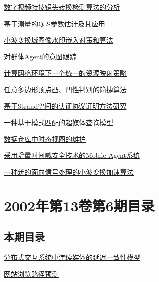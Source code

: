 \documentclass[a4paper]{article}
\begin{document}
\href{http://www.jos.org.cn/ch/reader/download_pdf.aspx?file_no=20020713&year_id=2002&quarter_id=7&falg=1}{数字视频特技镜头转换检测算法的分析}

\href{http://www.jos.org.cn/ch/reader/download_pdf.aspx?file_no=20020714&year_id=2002&quarter_id=7&falg=1}{基于测量的QoS参数估计及其应用}

\href{http://www.jos.org.cn/ch/reader/download_pdf.aspx?file_no=20020715&year_id=2002&quarter_id=7&falg=1}{小波变换域图像水印嵌入对策和算法}

\href{http://www.jos.org.cn/ch/reader/download_pdf.aspx?file_no=20020716&year_id=2002&quarter_id=7&falg=1}{对群体Agent的意图跟踪}

\href{http://www.jos.org.cn/ch/reader/download_pdf.aspx?file_no=20020717&year_id=2002&quarter_id=7&falg=1}{计算网格环境下一个统一的资源映射策略}

\href{http://www.jos.org.cn/ch/reader/download_pdf.aspx?file_no=20020718&year_id=2002&quarter_id=7&falg=1}{任意多边形顶点凸、凹性判别的简捷算法}

\href{http://www.jos.org.cn/ch/reader/download_pdf.aspx?file_no=20020719&year_id=2002&quarter_id=7&falg=1}{基于Strand空间的认证协议证明方法研究}

\href{http://www.jos.org.cn/ch/reader/download_pdf.aspx?file_no=20020720&year_id=2002&quarter_id=7&falg=1}{一种基于模式匹配的超媒体查询模型}

\href{http://www.jos.org.cn/ch/reader/download_pdf.aspx?file_no=20020721&year_id=2002&quarter_id=7&falg=1}{数据仓库中时态视图的维护}

\href{http://www.jos.org.cn/ch/reader/download_pdf.aspx?file_no=20020722&year_id=2002&quarter_id=7&falg=1}{采用增量时间戳安全技术的Mobile Agent系统}

\href{http://www.jos.org.cn/ch/reader/download_pdf.aspx?file_no=20020723&year_id=2002&quarter_id=7&falg=1}{一种新的面向信号处理的小波变换加速算法}


\section{\textbf{2002年第13卷第6期目录}}
\subsection{本期目录}
\href{http://www.jos.org.cn/ch/reader/download_pdf.aspx?file_no=20020601&year_id=2002&quarter_id=6&falg=1}{分布式交互系统中连续媒体的延迟一致性模型}

\href{http://www.jos.org.cn/ch/reader/download_pdf.aspx?file_no=20020602&year_id=2002&quarter_id=6&falg=1}{网站浏览路径预测}
\end{document}
